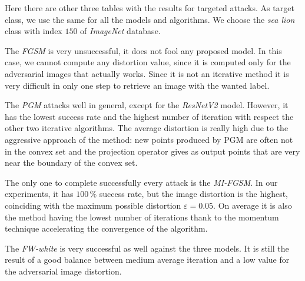 \documentclass[10pt,twocolumn,letterpaper, english]{article}
\theoremstyle{definition}
\theoremstyle{plain}
\theoremstyle{plain}
\theoremstyle{plain}
\theoremstyle{plain}
\theoremstyle{remark}
\theoremstyle{remark}
\theoremstyle{definition}
\theoremstyle{definition}
\theoremstyle{definition}
\theoremstyle{definition}
\renewcommand{\epsilon}{\varepsilon}
\begin{document}


Here there are other three tables with the results for targeted attacks. 
As target class, we use the same for all the models and algorithms. 
We choose the \textit{sea lion} class with index $150$ of \textit{ImageNet} database. 

The \textit{FGSM} is very unsuccessful, it does not fool any proposed model. 
In this case, we cannot compute any distortion value, since it is computed only for the adversarial images that actually works. Since it is not an iterative method it is very difficult in only one step
to retrieve an image with the wanted label.

The \textit{PGM} attacks well in general, except for the \textit{ResNetV2} model. 
However, it has the lowest success rate and the highest number of iteration with respect the other two iterative algorithms. The average distortion is really high due to the aggressive approach of the method: new points produced by PGM are often not in the convex set and the projection operator gives as output points that are very near the boundary of the convex set.

The only one to complete successfully every attack is the \textit{MI-FGSM}. 
In our experiments, it has $100\,\%$ success rate, but the image distortion is the highest, coinciding with the maximum possible distortion $\epsilon = 0.05$. On average it is also the method having the lowest number of iterations thank to the momentum technique accelerating the convergence of the algorithm.

The \textit{FW-white} is very successful as well against the three models. 
It is still the result of a good balance between medium average iteration and a low value for the adversarial image distortion. \\
\end{document}
